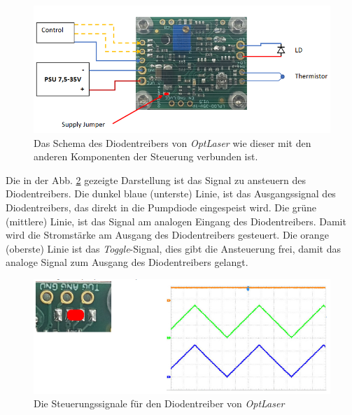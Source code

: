 \begin{figure}[H]
    \centering
    \includegraphics[scale=0.6, trim={0mm 0mm 0mm 0mm}, clip]{98_images/ldd_schema_connections.PNG}
    \caption{Das Schema des Diodentreibers von \textit{OptLaser} wie dieser mit den anderen Komponenten der Steuerung verbunden ist.}
    \label{fig:diodentreiber_schema_hw}
\end{figure}

Die in der Abb. \ref{fig:diodentreiber_modus_hw} gezeigte Darstellung ist das Signal zu ansteuern des Diodentreibers. Die dunkel blaue (unterste) Linie, ist das Ausgangssignal des Diodentreibers, das direkt in die Pumpdiode eingespeist wird. Die grüne (mittlere) Linie, ist das Signal am analogen Eingang des Diodentreibers. Damit wird die Stromstärke am Ausgang des Diodentreibers gesteuert. Die orange (oberste) Linie ist das \textit{Toggle}-Signal, dies gibt die Ansteuerung frei, damit das analoge Signal zum Ausgang des Diodentreibers gelangt.

\begin{figure}[H]
    \centering
    \includegraphics[scale=0.75, trim={70mm 0mm 0mm 0mm}, clip]{98_images/ldd_schema_modus.PNG}
    \caption{Die Steuerungssignale für den Diodentreiber von \textit{OptLaser}}
    \label{fig:diodentreiber_modus_hw}
\end{figure}

